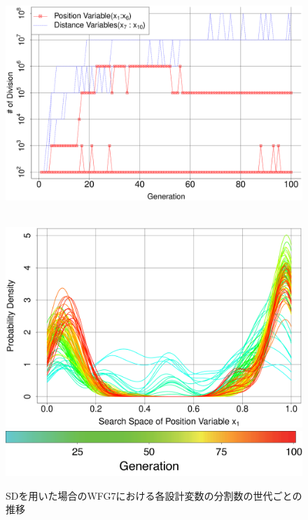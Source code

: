 \documentclass[../main/main]{subfiles}
\begin{document}
\begin{figure}[!h]
\begin{minipage}{0.38\hsize}
\vspace{-0.2in}
\includegraphics[width=1\linewidth]{../figures/WFG7_digit_trend.eps}\\
\\
\caption{SDを用いた場合のWFG7における各設計変数の分割数の世代ごとの推移}
\label{digi_trans_wfg7}
\end{minipage}
\begin{minipage}{0.61\hsize}
\begin{minipage}{0.49\hsize}
\includegraphics[width=1\linewidth]{../figures/WFG7_var1_pdf_trend.eps}\\
\centering
\hspace{0.2in} \includegraphics[width=0.8\linewidth]{../figures/color_bar_100ver.eps}

\end{minipage}
\end{minipage}
\end{figure}
\end{document}
